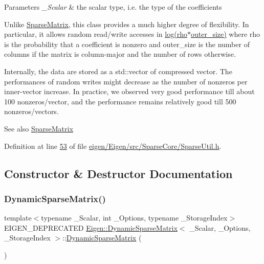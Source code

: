 \begin{DoxyParams}{Parameters}
{\em \+\_\+\+Scalar} & the scalar type, i.\+e. the type of the coefficients\\
\hline
\end{DoxyParams}
Unlike \hyperlink{group___sparse_core___module_class_eigen_1_1_sparse_matrix}{Sparse\+Matrix}, this class provides a much higher degree of flexibility. In particular, it allows random read/write accesses in \hyperlink{structlog}{log(rho$\ast$outer\+\_\+size)} where {\ttfamily rho} is the probability that a coefficient is nonzero and outer\+\_\+size is the number of columns if the matrix is column-\/major and the number of rows otherwise.

Internally, the data are stored as a std\+::vector of compressed vector. The performances of random writes might decrease as the number of nonzeros per inner-\/vector increase. In practice, we observed very good performance till about 100 nonzeros/vector, and the performance remains relatively good till 500 nonzeros/vectors.

\begin{DoxySeeAlso}{See also}
\hyperlink{group___sparse_core___module_class_eigen_1_1_sparse_matrix}{Sparse\+Matrix} 
\end{DoxySeeAlso}


Definition at line \hyperlink{eigen_2_eigen_2src_2_sparse_core_2_sparse_util_8h_source_l00053}{53} of file \hyperlink{eigen_2_eigen_2src_2_sparse_core_2_sparse_util_8h_source}{eigen/\+Eigen/src/\+Sparse\+Core/\+Sparse\+Util.\+h}.



\subsection{Constructor \& Destructor Documentation}
\mbox{\label{class_eigen_1_1_dynamic_sparse_matrix_a46a6947fcf115e6b7b731a8e01e7995d}} 
\subsubsection{\texorpdfstring{Dynamic\+Sparse\+Matrix()}{DynamicSparseMatrix()}\hspace{0.1cm}{\footnotesize\ttfamily [1/6]}}
{\footnotesize\ttfamily template$<$typename \+\_\+\+Scalar, int \+\_\+\+Options, typename \+\_\+\+Storage\+Index$>$ \\
E\+I\+G\+E\+N\+\_\+\+D\+E\+P\+R\+E\+C\+A\+T\+ED \hyperlink{class_eigen_1_1_dynamic_sparse_matrix}{Eigen\+::\+Dynamic\+Sparse\+Matrix}$<$ \+\_\+\+Scalar, \+\_\+\+Options, \+\_\+\+Storage\+Index $>$\+::\hyperlink{class_eigen_1_1_dynamic_sparse_matrix}{Dynamic\+Sparse\+Matrix} (\begin{DoxyParamCaption}{ }\end{DoxyParamCaption})\hspace{0.3cm}{\ttfamily [inline]}}

